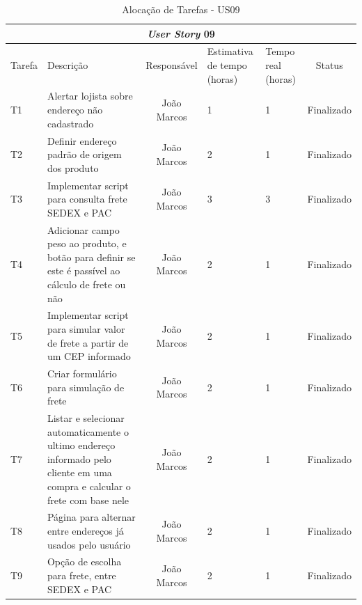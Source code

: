 \documentclass[a4paper,12pt]{monografia}
\begin{document}
\begin{longtable}{|p{1.5cm}|p{3.5cm}|c|p{2cm}|p{2cm}|c|}
\caption{Alocação de Tarefas - US09}
\label{quadro:tat-us09}
\hline
\multicolumn{6}{|c|}{\textbf{\textit{User Story} 09}}\\
\hline		
\rowcolor{ballblue}
Tarefa & Descrição & Responsável & Estimativa de tempo (horas) & Tempo real (horas) & Status\\
\hline
T1 & Alertar lojista sobre endereço não cadastrado & João Marcos & 1 & 1 & Finalizado\\
\hline
T2 & Definir endereço padrão de origem dos produto & João Marcos & 2 & 1 & Finalizado\\
\hline
T3 & Implementar script para consulta frete SEDEX e PAC & João Marcos & 3 & 3 & Finalizado\\
\hline
T4 & Adicionar campo peso ao produto, e botão para definir se este é passível ao cálculo de frete ou não & João Marcos & 2 & 1 & Finalizado\\
\hline
T5 & Implementar script para simular valor de frete a partir de um CEP informado & João Marcos & 2 & 1 & Finalizado\\
\hline
T6 & Criar formulário para simulação de frete & João Marcos & 2 & 1 & Finalizado\\
\hline
T7 & Listar e selecionar automaticamente o ultimo endereço informado pelo cliente em uma compra e calcular o frete com base nele & João Marcos & 2 & 1 & Finalizado\\
\hline
T8 & Página para alternar entre endereços já usados pelo usuário & João Marcos & 2 & 1 & Finalizado\\
\hline
T9 & Opção de escolha para frete, entre SEDEX e PAC & João Marcos & 2 & 1 & Finalizado\\
\hline
\end{longtable}
\end{document}
